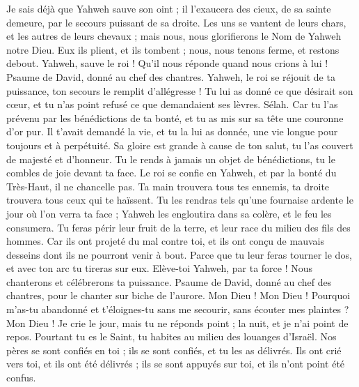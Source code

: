 \begin{multicols}{2}
Je sais déjà que Yahweh sauve son oint ; il l'exaucera des cieux, de sa sainte demeure, par le secours puissant de sa droite.
Les uns se vantent de leurs chars, et les autres de leurs chevaux ; mais nous, nous glorifierons le Nom de Yahweh notre Dieu.
Eux ils plient, et ils tombent ; nous, nous tenons ferme, et restons debout.
Yahweh, sauve le roi ! Qu'il nous réponde quand nous crions à lui !
\VerseOne{}Psaume de David, donné au chef des chantres.
Yahweh, le roi se réjouit de ta puissance, ton secours le remplit d'allégresse !
Tu lui as donné ce que désirait son cœur, et tu n'as point refusé ce que demandaient ses lèvres. Sélah.
Car tu l'as prévenu par les bénédictions de ta bonté, et tu as mis sur sa tête une couronne d'or pur.
Il t'avait demandé la vie, et tu la lui as donnée, une vie longue pour toujours et à perpétuité.
Sa gloire est grande à cause de ton salut, tu l'as couvert de majesté et d'honneur.
Tu le rends à jamais un objet de bénédictions, tu le combles de joie devant ta face.
Le roi se confie en Yahweh, et par la bonté du Très-Haut, il ne chancelle pas.
Ta main trouvera tous tes ennemis, ta droite trouvera tous ceux qui te haïssent.
Tu les rendras tels qu'une fournaise ardente le jour où l'on verra ta face ; Yahweh les engloutira dans sa colère, et le feu les consumera.
Tu feras périr leur fruit de la terre, et leur race du milieu des fils des hommes.
Car ils ont projeté du mal contre toi, et ils ont conçu de mauvais desseins dont ils ne pourront venir à bout.
Parce que tu leur feras tourner le dos, et avec ton arc tu tireras sur eux.
Elève-toi Yahweh, par ta force ! Nous chanterons et célébrerons ta puissance.
\VerseOne{}Psaume de David, donné au chef des chantres, pour le chanter sur biche de l'aurore.
Mon Dieu ! Mon Dieu ! Pourquoi m'as-tu abandonné et t'éloignes-tu sans me secourir, sans écouter mes plaintes ?
Mon Dieu ! Je crie le jour, mais tu ne réponds point ; la nuit, et je n'ai point de repos.
Pourtant tu es le Saint, tu habites au milieu des louanges d'Israël.
Nos pères se sont confiés en toi ; ils se sont confiés, et tu les as délivrés.
Ils ont crié vers toi, et ils ont été délivrés ; ils se sont appuyés sur toi, et ils n'ont point été confus.

\end{multicols}
